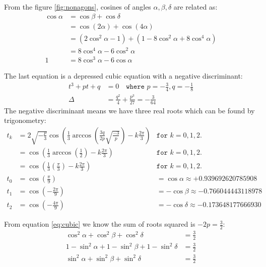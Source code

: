 \documentclass[11pt]{article}
\begin{document}
From the figure \ref{fig:nonagons}, cosines of angles $\alpha, \beta, \delta$ are related as:
\begin{align}
\cos\alpha &= \cos\beta + \cos\delta \label{eq:cosines-alpha-beta-delta-sum} \\
 &= \cos(2\alpha) + \cos(4\alpha) \nonumber\\
 &= (2\cos^2\alpha - 1) + (1 -8\cos^2\alpha + 8\cos^4\alpha) \nonumber\\
 &= 8\cos^4\alpha - 6\cos^2\alpha \nonumber\\
 1 &= 8\cos^3\alpha - 6\cos\alpha
\end{align}

The last equation is a depressed cubic equation with a negative discriminant:
\begin{align}
t^3 +pt +q &= 0 \label{eq:cubic} \quad\texttt{where } p = -\frac{3}{4}, q = -\frac{1}{8} \\
\Delta &= \frac{q^2}{4} + \frac{p^3}{27} = -\frac{3}{64} \nonumber
\end{align}
The negative discriminant means we have three real roots which can be found by trigonometry:
\begin{align}
t_k &= 2\sqrt{-\frac{p}{3}}\cos\left({\frac{1}{3}\arccos\left(
\frac{3q}{2p}\sqrt{\frac{-3}{p}}
\right) -k\frac{2\pi}{3}}\right) &\texttt{for } k=0,1,2. \nonumber\\
&= \cos\left(\frac{1}{3}\arccos\left(\frac{1}{2}\right) -k\frac{2\pi}{3} \right)  &\texttt{for } k=0,1,2. \nonumber\\
&= \cos\left(\frac{1}{3}\left(\frac{\pi}{3}\right) -k\frac{2\pi}{3} \right)  &\texttt{for } k=0,1,2. \nonumber\\
t_0 &= \cos\left(\frac{\pi}{9}\right)   &= \cos\alpha \approx +0.939692620785908\\
t_1 &= \cos\left(-\frac{2\pi}{9}\right) &= -\cos\beta \approx -0.766044443118978 \\
t_2 &= \cos\left(-\frac{4\pi}{9}\right) &= -\cos\delta \approx -0.173648177666930
\end{align}

From equation \ref{eq:cubic} we know the sum of roots squared is $-2p = \frac{3}{2}$:
\begin{align}
\cos^2\alpha + \cos^2\beta + \cos^2\delta &= \frac{3}{2} \\
1 - \sin^2\alpha + 1 - \sin^2\beta + 1 - \sin^2\delta &= \frac{3}{2} \nonumber\\
\sin^2\alpha + \sin^2\beta + \sin^2\delta &= \frac{3}{2}
\end{align}
\end{document}
